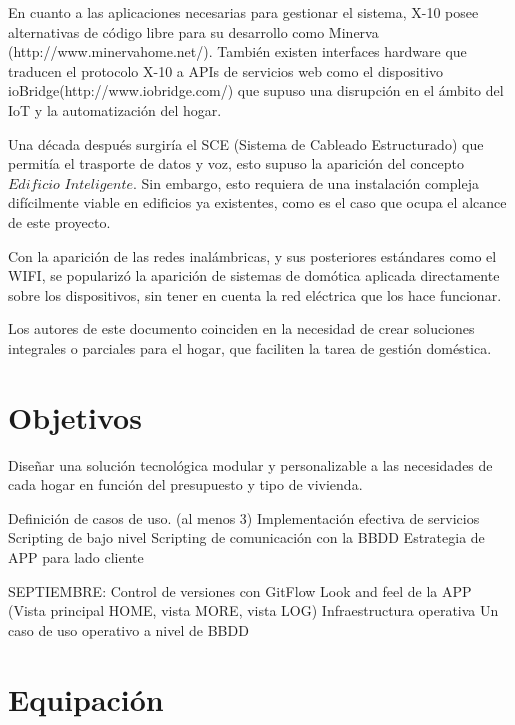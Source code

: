 En cuanto a las aplicaciones necesarias para gestionar el sistema, X-10 posee alternativas de código libre para su desarrollo como Minerva (http://www.minervahome.net/). También existen interfaces hardware que traducen el protocolo X-10 a APIs de servicios web como el dispositivo ioBridge(http://www.iobridge.com/) que supuso una disrupción en el ámbito del IoT y la automatización del hogar.

Una década después surgiría el SCE (Sistema de Cableado Estructurado) que permitía el trasporte de datos y voz, esto supuso la aparición del concepto $Edificio$ $Inteligente$. Sin embargo, esto requiera de una instalación compleja difícilmente viable en edificios ya existentes, como es el caso que ocupa el alcance de este proyecto.

Con la aparición de las redes inalámbricas, y sus posteriores estándares como el WIFI, se popularizó la aparición de sistemas de domótica aplicada directamente sobre los dispositivos, sin tener en cuenta la red eléctrica que los hace funcionar.

Los autores de este documento coinciden en la necesidad de crear soluciones integrales o parciales para el hogar, que faciliten la tarea de gestión doméstica.



\section{Objetivos}
\label{makereference1.2}

Diseñar una solución tecnológica modular y personalizable a las necesidades de cada hogar en función del presupuesto y tipo de vivienda.

Definición de casos de uso. (al menos 3)
Implementación efectiva de servicios
Scripting de bajo nivel
Scripting de comunicación con la BBDD
Estrategia de APP para lado cliente

SEPTIEMBRE:
Control de versiones con GitFlow
Look and feel de la APP (Vista principal HOME, vista MORE, vista LOG)
Infraestructura operativa
Un caso de uso operativo a nivel de BBDD


\section{Equipación}
\label{makereference1.3}

